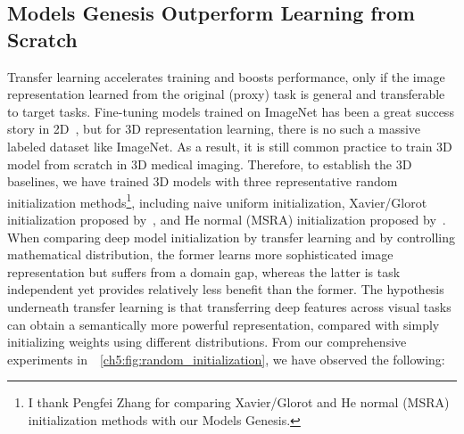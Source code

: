
\subsection{Models Genesis Outperform Learning from Scratch}
\label{ch5:surpass_scratch}


Transfer learning accelerates training and boosts performance, only if the image representation learned from the original (proxy) task is general and transferable to target tasks. Fine-tuning models trained on ImageNet has been a great success story in 2D~\citep{bar2015chest,tajbakhsh2016convolutional,shin2016deep}, but for 3D representation learning, there is no such a massive labeled dataset like ImageNet. As a result, it is still common practice to train 3D model from scratch in 3D medical imaging.
Therefore, to establish the 3D baselines, we have trained 3D models with three representative random initialization methods\footnote{I thank Pengfei Zhang for comparing Xavier/Glorot and He normal (MSRA) initialization methods with our Models Genesis.}, including naive uniform initialization, Xavier/Glorot initialization proposed by~\citet{glorot2010understanding}, and He normal (MSRA) initialization proposed by~\citet{he2015delving}. 
When comparing deep model initialization by transfer learning and by controlling mathematical distribution, the former learns more sophisticated image representation but suffers from a domain gap, whereas the latter is task independent yet provides relatively less benefit than the former. The hypothesis underneath transfer learning is that transferring deep features across visual tasks can obtain a semantically more powerful representation, compared with simply initializing weights using different distributions.
From our comprehensive experiments in~\figurename~\ref{ch5:fig:random_initialization}, we have observed the following:
